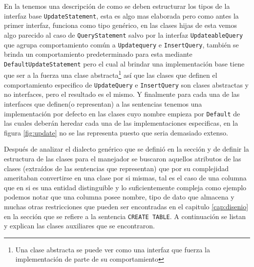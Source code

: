 En la  tenemos una descripción de como se deben estructurar los tipos de la interfaz base \verb=UpdateStatement=, esta es algo mas elaborada pero como antes la primer interfaz, funciona como tipo genérico, en las clases hijas de esta vemos algo parecido al caso de \verb=QueryStatement= salvo por la interfaz \verb=UpdateableQuery= que agrupa comportamiento común a \verb=Updatequery= e \verb=InsertQuery=, también se brinda un comportamiento predeterminado para esta mediante \verb=DefaultUpdateStatement= pero el cual al brindar una implementación base tiene que ser a la fuerza una clase abstracta\footnote{Una clase abstracta se puede ver como una interfaz que fuerza la implementación de parte de su comportamiento} así que las clases que definen el comportamiento especifico de \verb=UpdateQuery= e \verb=InsertQuery= son clases abstractas y no interfaces, pero el resultado es el mismo. Y finalmente para cada una de las interfaces que definen(o representan) a las sentencias tenemos una implementación por defecto en las clases cuyo nombre empieza por \verb=Default= de las cuales deberán heredar cada una de las implementaciones especificas, en la figura \ref{fig:update} no se las representa puesto que seria demasiado extenso.

Después de analizar el dialecto genérico que se definió en la sección  y de definir la estructura de las clases para el manejador se buscaron aquellos atributos de las clases (extraídos de las sentencias que representan) que por su complejidad ameritaban convertirse en una clase por si mismas, tal es el caso de una columna que en si es una entidad distinguible y lo suficientemente compleja como ejemplo podemos notar que una columna posee nombre, tipo de dato que almacena y muchas otras restricciones que pueden ser encontradas en el capitulo \ref{cap:disenio} en la sección que se refiere a la sentencia \verb=CREATE TABLE=. A continuación se listan y explican las clases auxiliares que se encontraron. 
%
